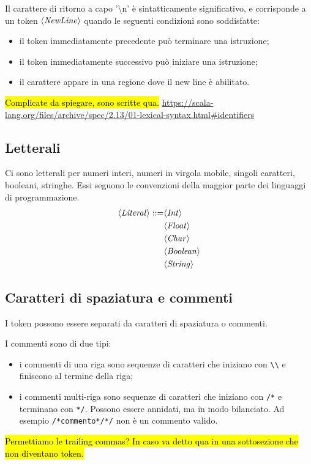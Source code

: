 Il carattere di ritorno a capo '\textbackslash n' è sintatticamente significativo, e corrisponde a un token $\langle \mathit{NewLine} \rangle$ quando le seguenti condizioni sono soddisfatte:
\begin{itemize}
	\item il token immediatamente precedente può terminare una istruzione;
	\item il token immediatamente successivo può iniziare una istruzione;
	\item il carattere appare in una regione dove il new line è abilitato.
\end{itemize}
\hl{Complicate da spiegare, sono scritte qua. }
\url{https://scala-lang.org/files/archive/spec/2.13/01-lexical-syntax.html#identifiers}

\subsection*{Letterali}
Ci sono letterali per numeri interi, numeri in virgola mobile, singoli caratteri, booleani, stringhe. Essi seguono le convenzioni della maggior parte dei linguaggi di programmazione.
\begin{align*}
\langle \mathit{Literal} \rangle ::=
& \langle \mathit{Int} \rangle\\
& \langle \mathit{Float} \rangle\\
& \langle \mathit{Char} \rangle\\
& \langle \mathit{Boolean} \rangle\\
& \langle \mathit{String} \rangle
\end{align*}

\subsection*{Caratteri di spaziatura e commenti}
I token possono essere separati da caratteri di spaziatura o commenti.

I commenti sono di due tipi:
\begin{itemize}
	\item i commenti di una riga sono sequenze di caratteri che iniziano con \verb$\\$ e finiscono al termine della riga;
	\item i commenti multi-riga sono sequenze di caratteri che iniziano con \verb$/*$ e terminano con \verb$*/$. Possono essere annidati, ma in modo bilanciato. Ad esempio \verb$/*commento*/*/$ non è un commento valido.
\end{itemize}

\hl{Permettiamo le trailing commas? In caso va detto qua in una sottosezione che non diventano token.}

